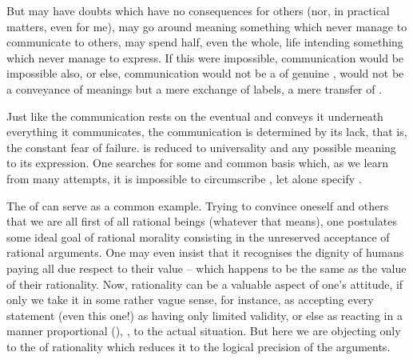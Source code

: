 But  may have doubts which have no consequences for others (nor, in
practical matters, even for me),  may go around meaning something which
 never manage to communicate to others,  may spend half, even the
whole, life intending something which  never manage to express. If this
were impossible, communication would be impossible also, or else, communication
would not be a  of genuine , would not be a
conveyance of meanings but a mere exchange of labels, a mere transfer of
.

\pa Just like the  communication rests on the eventual
 and conveys it underneath everything it  communicates,
the  communication is determined by its lack, that is, the
constant fear of failure.  is reduced to universality and any
possible meaning to its  expression. One searches for some
 and common basis which, as we learn from many attempts, it is
impossible to circumscribe , let alone specify .

The  of  can serve as a common
example. Trying to convince oneself and others that we are
all first of all rational beings (whatever that means), one postulates some
ideal goal of rational morality consisting in the unreserved acceptance of
rational arguments. One may even insist that it recognises the dignity of humans
paying all due respect to their value -- which happens to be the same as the
value of their rationality. Now, rationality can be a valuable aspect of one's
attitude, if only we take it in some rather vague sense, for instance, as
accepting every statement (even this one!) as having only limited validity, or
else as reacting in a manner proportional (), , to the actual situation. But here we are objecting only to the 
of rationality which reduces it to the logical precision of the arguments.

